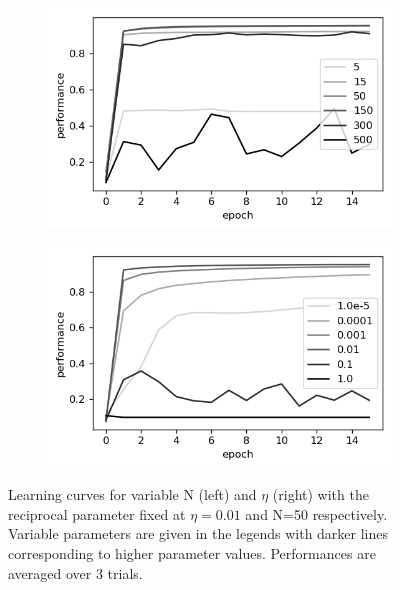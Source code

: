 \documentclass{article}
\begin{document}
\begin{figure}[h]
	\centering
	\begin{subfigure}[t]{0.42\linewidth}
		\centering
		\includegraphics[width = 1.0\linewidth, trim={5 5 5 5}, clip=true]{figures/test_N_bigrange.png}
	\end{subfigure}%
	\hspace{0.05 \linewidth}
	\begin{subfigure}[t]{0.42\linewidth}
		\centering
		\includegraphics[width = 1.0\linewidth, trim={5 5 5 5}, clip=true]{figures/testeta_real.png}
	\end{subfigure}%
\caption{Learning curves for variable N (left) and $\eta$ (right) with the reciprocal parameter fixed at $\eta=0.01$ and N=50 respectively. Variable parameters are given in the legends with darker lines corresponding to higher parameter values. Performances are averaged over 3 trials.}
\label{fig:learning_curves}
\end{figure}
\end{document}
